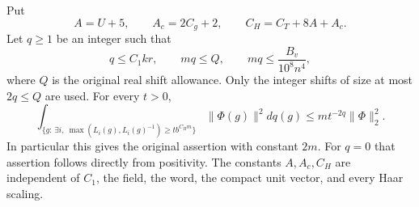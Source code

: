 \begin{theorem}\label{global-gram-original-all-length-tail}
Put
\[
 A=U+5,\qquad A_c=2C_g+2,\qquad
 C_H=C_T+8A+A_c.
\]
Let $q\ge1$ be an integer such that
\[
 q\le C_1kr,\qquad mq\le Q,\qquad
                   mq\le\frac{B_v}{10^8n^4},
\]
where $Q$ is the original real shift allowance.  Only the integer
shifts of size at most $2q\le Q$ are used.  For every $t>0$,
\begin{equation}\label{global-gram-original-length-tail-bound}
 \int_{\{g:\,\exists i,\ \max(L_i(g),L_i(g)^{-1})
                                  \ge t b^{C_Hm}\}}
       \|\Phi(g)\|^2dq(g)
       \le m t^{-2q}\|\Phi\|_2^2.
\end{equation}
In particular this gives the original assertion with constant
$2m$.  For $q=0$ that assertion follows directly from positivity.
The constants $A,A_c,C_H$ are independent of $C_1$, the field,
the word, the compact unit vector, and every Haar scaling.
\end{theorem}
